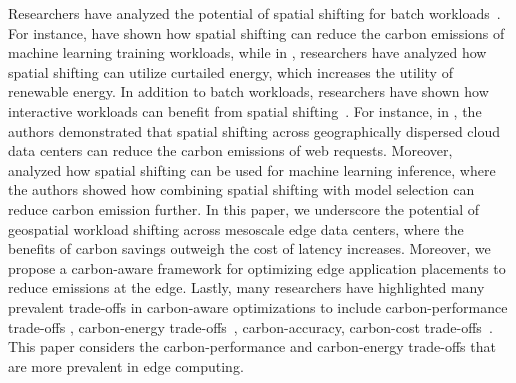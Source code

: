 

Researchers have analyzed the potential of spatial shifting for batch workloads~\cite{cloudcarbon, sukprasert2024limitations, Zheng2020:Curtailment, Lin2023:Adapting}. For instance, \cite{cloudcarbon} have shown how spatial shifting can reduce the carbon emissions of machine learning training workloads, while in \cite{Zheng2020:Curtailment}, researchers have analyzed how spatial shifting can utilize curtailed energy, which increases the utility of renewable energy.
In addition to batch workloads, researchers have shown how interactive workloads can benefit from spatial shifting~\cite{sukprasert2024limitations, igsc2023-casper, Baolin2023:Clover, Chadha2023:GreenCourier, maji_hotcarbon23, Gsteiger2024:Caribou, Gao-2012-being-green, Murillo2024:CDNShifter}. For instance, in \cite{sukprasert2024limitations, igsc2023-casper}, the authors demonstrated that spatial shifting across geographically dispersed cloud data centers can reduce the carbon emissions of web requests. Moreover,~\cite{Baolin2023:Clover} analyzed how spatial shifting can be used for machine learning inference, where the authors showed how combining spatial shifting with model selection can reduce carbon emission further. In this paper, we underscore the potential of geospatial workload shifting across mesoscale edge data centers, where the benefits of carbon savings outweigh the cost of latency increases. Moreover, we propose a carbon-aware framework for optimizing edge application placements to reduce emissions at the edge. 
Lastly, many researchers have highlighted many prevalent trade-offs in carbon-aware optimizations to include carbon-performance trade-offs \cite{wait-awhile, igsc2023-casper}, carbon-energy trade-offs~\cite{Baolin2023:Clover, Gupta2022:Chasing, Jiang204:EcoLife}, carbon-accuracy\cite{Baolin2023:Clover}, carbon-cost trade-offs~\cite{Gao-2012-being-green, Murillo2024:CDNShifter}.
This paper considers the carbon-performance and carbon-energy trade-offs that are more prevalent in edge computing.



